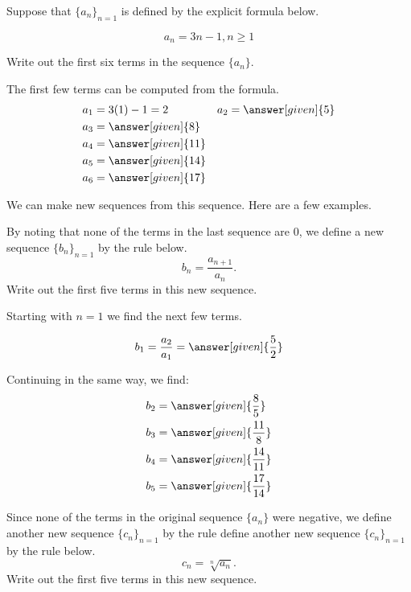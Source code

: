 \documentclass{ximera}
\begin{document}
\begin{example}
Suppose that $\{a_n\}_{n=1}$ is defined by the explicit formula below.

\[
a_n = 3n-1, n \geq 1
\]

Write out the first six terms in the sequence $\{a_n\}$.
\begin{explanation}
  The first few terms can be computed from the formula.
    \begin{align*}
      a_1 &= 3(1)-1=2 & 
      a_2 &= \answer[given]{5} \\ 
      a_3 &= \answer[given]{8} \\ 
      a_4 &= \answer[given]{11} \\ 
      a_5 &= \answer[given]{14}  \\ 
      a_6 &= \answer[given]{17} 
    \end{align*}
\end{explanation}


We can make new sequences from this sequence.  Here are a few examples.

\begin{question}
By noting that none of the terms in the last sequence are $0$, we
define a new sequence $\{b_n\}_{n=1}$ by the rule below.
\[
b_n = \frac{a_{n+1}}{a_n}. 
\]
Write out the first five terms in this new sequence.

\begin{explanation}
Starting with $n=1$ we find the next few terms.

\[      b_1 = \frac{a_2}{a_1} = \answer[given]{\frac{5}{2}}       \]
      
Continuing in the same way, we find:     
     \begin{align*}
      	b_2 &=  \answer[given]{\frac{8}{5}}  \\ 
	b_3 &= \answer[given]{\frac{11}{8}}  \\ 
	b_4 &= \answer[given]{\frac{14}{11}}  \\ 
	b_5 &=  \answer[given]{\frac{17}{14}}   
    \end{align*}
    
\end{explanation}
    
\end{question}

\begin{question}

Since none of the terms in the original sequence $\{a_n\}$ were
negative, we define another new sequence $\{c_n\}_{n=1}$ by the rule
define another new sequence $\{c_n\}_{n=1}$ by the rule below.
\[
c_n = \sqrt[n]{a_n} .
\]
Write out the first five terms in this new sequence.


\end{question}
\end{example}
\end{document}
